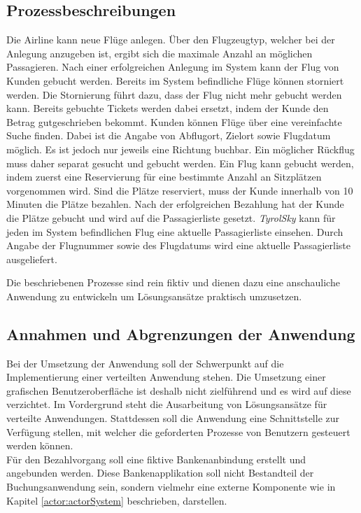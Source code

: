 \subsection{Prozessbeschreibungen}
\begin{enumerate}
     Die Airline kann neue Flüge anlegen. Über den Flugzeugtyp, welcher bei der Anlegung anzugeben ist, ergibt sich die maximale Anzahl an möglichen Passagieren. Nach einer erfolgreichen Anlegung im System kann der Flug von Kunden gebucht werden.
     Bereits im System befindliche Flüge können storniert werden. Die Stornierung führt dazu, dass der Flug nicht mehr gebucht werden kann. Bereits gebuchte Tickets werden dabei ersetzt, indem der Kunde den Betrag gutgeschrieben bekommt.
    Kunden können Flüge über eine vereinfachte Suche finden. Dabei ist die Angabe von Abflugort, Zielort sowie Flugdatum möglich. Es ist jedoch nur jeweils eine Richtung buchbar. Ein möglicher Rückflug muss daher separat gesucht und gebucht werden. 
    Ein Flug kann gebucht werden, indem zuerst eine Reservierung für eine bestimmte Anzahl an Sitzplätzen vorgenommen wird. Sind die Plätze reserviert, muss der Kunde innerhalb von 10 Minuten die Plätze bezahlen. Nach der erfolgreichen Bezahlung hat der Kunde die Plätze gebucht und wird auf die Passagierliste gesetzt. 
    \textit{TyrolSky} kann für jeden im System befindlichen Flug eine aktuelle Passagierliste einsehen. Durch Angabe der Flugnummer sowie des Flugdatums wird eine aktuelle Passagierliste ausgeliefert.
\end{enumerate}
Die beschriebenen Prozesse sind rein fiktiv und dienen dazu eine anschauliche Anwendung zu entwickeln um Lösungsansätze praktisch umzusetzen. 

\subsection{Annahmen und Abgrenzungen der Anwendung}
Bei der Umsetzung der Anwendung soll der Schwerpunkt auf die Implementierung einer verteilten Anwendung stehen. Die Umsetzung einer grafischen Benutzeroberfläche ist deshalb nicht zielführend und es wird auf diese verzichtet. Im Vordergrund steht die Ausarbeitung von Lösungsansätze für verteilte Anwendungen. Stattdessen soll die Anwendung eine Schnittstelle zur Verfügung stellen, mit welcher die geforderten Prozesse von Benutzern gesteuert werden können. \\
Für den Bezahlvorgang soll eine fiktive Bankenanbindung erstellt und angebunden werden. Diese Bankenapplikation soll nicht Bestandteil der Buchungsanwendung sein, sondern vielmehr eine externe Komponente wie in Kapitel \ref{actor:actorSystem} beschrieben, darstellen. 

